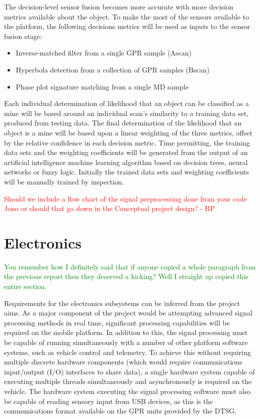 \documentclass[main.tex]{subfiles}
\begin{document}
The decision-level sensor fusion becomes more accurate with more decision metrics available about the object. To make the most of the sensors available to the platform, the following decisions metrics will be used as inputs to the sensor fusion stage:
\begin{itemize}
\item Inverse-matched filter from a single GPR sample (Ascan)
\item Hyperbola detection from a collection of GPR samples (Bscan)
\item Phase plot signature matching from a single MD sample
\end{itemize}
Each individual determination of likelihood that an object can be classified as a mine will be based around an individual scan's similarity to a training data set, produced from testing data. The final determination of the likelihood that an object is a mine will be based upon a linear weighting of the three metrics, offset by the relative confidence in each decision metric. Time permitting, the training data sets and the weighting coefficients will be generated from the output of an artificial intelligence machine learning algorithm based on decision trees, neural networks or fuzzy logic. Initially the trained data sets and weighting coefficients will be manually trained by inspection.

\textcolor{red}{Should we include a flow chart of the signal preprocessing done from your code Jono or should that go down in the Conceptual project design? - RP}

\section{Electronics}
\textcolor{green}{You remember how I definitely said that if anyone copied a whole paragraph from the previous report then they deserved a kicking? Well I straight up copied this entire section.}

Requirements for the electronics subsystems can be inferred from the project aims. As a major component of the project would be attempting advanced signal processing methods in real time, significant processing capabilities will be required on the mobile platform. In addition to this, the signal processing must be capable of running simultaneously with a number of other platform software systems, such as vehicle control and telemetry. To achieve this without requiring multiple discrete hardware components (which would require communications input/output (I/O) interfaces to share data), a single hardware system capable of executing multiple threads simultaneously and asynchronously is required on the vehicle. The hardware system executing the signal processing software must also be capable of reading sensory input from USB devices, as this is the communications format available on the GPR units provided by the DTSG. 
% 
\end{document}
